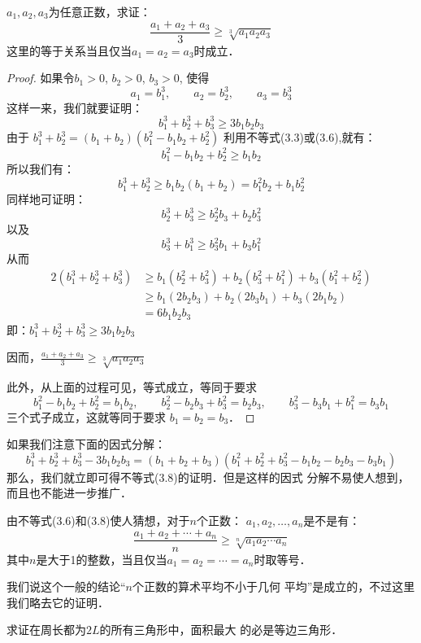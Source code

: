\begin{starexample}
$a_1,a_2,a_3$为任意正数，求证：
\begin{equation}
 \frac{a_1+a_2+a_3}{3}\ge \sqrt[3]{a_1a_2a_3}  
\end{equation}
这里的等于关系当且仅当$a_1=a_2=a_3$时成立．
\end{starexample}

\begin{proof}
    如果令$b_1>0$, $b_2>0$, $b_3>0$, 使得
\[a_1=b_1^3,\qquad a_2=b_2^3,\qquad  a_3=b_3^3\]
这样一来，我们就要证明：
\[b_1^3+b_2^3+b_3^3\ge 3b_1b_2b_3\]
由于
$b_1^3+b_2^3=(b_1+b_2)(b_1^2-b_1b_2+b^2_2)$
利用不等式(3.3)或(3.6),就有：
\[b_1^2 -b_1b_2+b_2^2\ge b_1b_2\]
所以我们有：
\[b^3_1+b_2^3\ge b_1b_2(b_1+b_2)=b_1^2 b_2+b_1b_2^2\]
同样地可证明：
\[b_2^3+b_3^3\ge b_2^2b_3+b_2b^2_3\]
以及
\[b_3^3+b_1^3\ge b_3^2b_1+b_3b^2_1\]
从而
\[\begin{split}
    2(b_1^3+b_2^3+b_3^3) &\ge b_1(b^2_2+b^2_3)+b_2(b^2_3+b^2_1)+b_3(b^2_1+b^2_2)\\
    &\ge b_1(2b_2b_3)+b_2(2b_3b_1)+b_3(2b_1b_2)\\
    &=6b_1b_2b_3
\end{split}\]
即：$b_1^3+b_2^3+b_3^3\ge 3b_1b_2b_3$

因而，$\frac{a_1+a_2+a_3}{3}\ge \sqrt[3]{a_1a_2a_3}  $

此外，从上面的过程可见，等式成立，等同于要求
\[b_1^2-b_1b_2 +b_2^2=b_1b_2,\qquad  b_2^2 -b_2b_3+b_3^2 =b_2b_3,\qquad b_3^2-b_3b_1+b_1^2=b_3b_1\]
三个式子成立，这就等同于要求
$b_1=b_2=b_3$．
\end{proof}

\begin{rmk}
    如果我们注意下面的因式分解：
    \[b_1^3+b_2^3+b_3^3-3b_1b_2b_3=(b_1+b_2+b_3)(b_1^2+b_2^2
    +b^2_3-b_1b_2-b_2b_3-b_3b_1)\]
    那么，我们就立即可得不等式(3.8)的证明．但是这样的因式
    分解不易使人想到，而且也不能进一步推广． 
\end{rmk}

由不等式(3.6)和(3.8)使人猜想，对于$n$个正数：
$a_1,a_2,\ldots,a_n$是不是有：
\[\frac{a_1+a_2+\cdots+a_n}{n}\ge \sqrt[n]{a_1a_2\cdots a_n}\]
其中$n$是大于1的整数，当且仅当$a_1=a_2=\cdots=a_n$时取等号．

我们说这个一般的结论“$n$个正数的算术平均不小于几何
平均”是成立的，不过这里我们略去它的证明．

\begin{starexample}
    求证在周长都为$2L$的所有三角形中，面积最大
的必是等边三角形．
\end{starexample}

